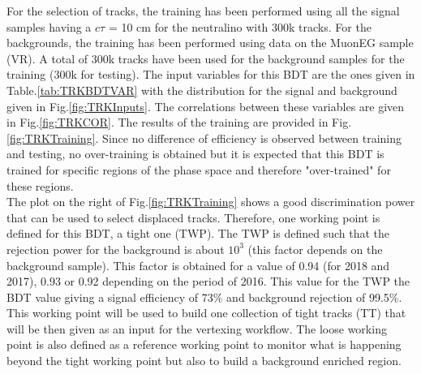 \documentclass{cernatlasnote}
\begin{document}
 For the selection of tracks, the training has been performed using all the signal samples having a $c\tau$ = 10 cm for the neutralino with 300k tracks. For the backgrounds, the training has been performed using data on the MuonEG sample (VR). A total of 300k tracks have been used for the background samples for the training (300k for testing). 
 The input variables for this BDT are the ones given in Table.\ref{tab:TRKBDTVAR} with the distribution for the signal and background given in Fig.\ref{fig:TRKInputs}. The correlations between these variables are given in Fig.\ref{fig:TRKCOR}. The results of the training are provided in Fig.\ref{fig:TRKTraining}. Since no difference of efficiency is observed between training and testing, no over-training is obtained but it is expected that this BDT is trained for specific regions of the phase space and therefore "over-trained" for these regions. \\
 The plot on the right of Fig.\ref{fig:TRKTraining} shows a good discrimination power that can be used to select displaced tracks. Therefore, one working point is defined for this BDT, a tight one (TWP). The TWP is defined such that the rejection power for the background is about $10^3$ (this factor depends on the background sample). This factor is obtained for a value of 0.94 (for 2018 and 2017), 0.93 or 0.92 depending on the period of 2016. This value for the TWP the BDT value giving a signal efficiency of 73\% and background rejection of 99.5\%. This working point will be used to build one collection of tight tracks (TT) that will be then given as an input for the vertexing workflow. The loose working point is also defined as a reference working point to monitor what is happening beyond the tight working point but also to build a background enriched region.
\end{document}
